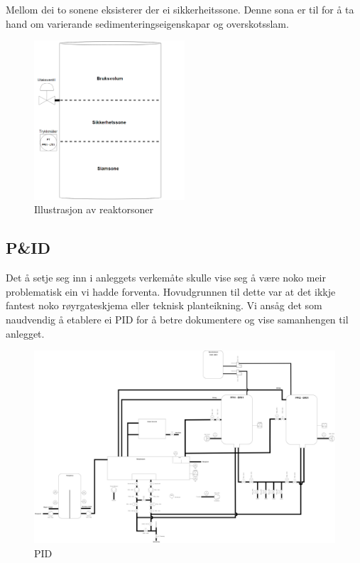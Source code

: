 Mellom dei to sonene eksisterer der ei sikkerheitssone.
Denne sona er til for å ta hand om varierande sedimenteringseigenskapar
og overskotsslam.\newline

\begin{figure}[htbp]
    \centering
    \includegraphics[width=0.5\textwidth]{Figurar/Reaktorsoner.png}
    \caption{Illustrasjon av reaktorsoner}\label{fig:Reaktorsonar}
\end{figure}

\subsection{P\&ID}

Det å setje seg inn i anleggets verkemåte skulle vise seg å være noko meir problematisk ein vi hadde forventa.
Hovudgrunnen til dette var at det ikkje fantest noko røyrgateskjema eller teknisk planteikning.
Vi ansåg det som naudvendig å etablere ei \gls{PID} for å betre dokumentere og vise samanhengen til anlegget.

\begin{figure}[htbp]
    \centering
    \includegraphics[angle=90,width=1\textwidth]{Figurar/PID.drawio.png}
    \caption{\gls{PID}}\label{fig:HMI}
\end{figure}
